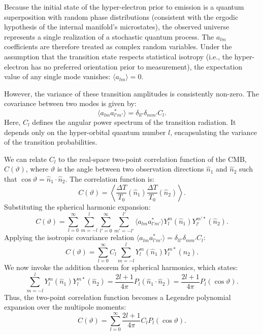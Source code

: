 Because the initial state of the hyper-electron prior to emission is a quantum superposition with random phase distributions (consistent with the ergodic hypothesis of the internal manifold's microstates), the observed universe represents a single realization of a stochastic quantum process. The $a_{lm}$ coefficients are therefore treated as complex random variables. Under the assumption that the transition state respects statistical isotropy (i.e., the hyper-electron has no preferred orientation prior to measurement), the expectation value of any single mode vanishes: $\langle a_{lm} \rangle = 0$.

However, the variance of these transition amplitudes is consistently non-zero. The covariance between two modes is given by:
\begin{equation}
\langle a_{lm} a_{l'm'}^* \rangle = \delta_{ll'} \delta_{mm'} C_l.
\end{equation}
Here, $C_l$ defines the angular power spectrum of the transition radiation. It depends only on the hyper-orbital quantum number $l$, encapsulating the variance of the transition probabilities.

We can relate $C_l$ to the real-space two-point correlation function of the CMB, $C(\vartheta)$, where $\vartheta$ is the angle between two observation directions $\hat{n}_1$ and $\hat{n}_2$ such that $\cos\vartheta = \hat{n}_1 \cdot \hat{n}_2$. The correlation function is:
\begin{equation}
C(\vartheta) = \left\langle \frac{\Delta T}{T_0}(\hat{n}_1) \frac{\Delta T}{T_0}(\hat{n}_2) \right\rangle.
\end{equation}
Substituting the spherical harmonic expansion:
\begin{equation}
C(\vartheta) = \sum_{l=0}^{\infty} \sum_{m=-l}^{l} \sum_{l'=0}^{\infty} \sum_{m'=-l'}^{l'} \langle a_{lm} a_{l'm'}^* \rangle Y_l^m(\hat{n}_1) Y_{l'}^{m'*}(\hat{n}_2).
\end{equation}
Applying the isotropic covariance relation $\langle a_{lm} a_{l'm'}^* \rangle = \delta_{ll'} \delta_{mm'} C_l$:
\begin{equation}
C(\vartheta) = \sum_{l=0}^{\infty} C_l \sum_{m=-l}^{l} Y_l^m(\hat{n}_1) Y_l^{m*}(\hat{n}_2).
\end{equation}
We now invoke the addition theorem for spherical harmonics, which states:
\begin{equation}
\sum_{m=-l}^{l} Y_l^m(\hat{n}_1) Y_l^{m*}(\hat{n}_2) = \frac{2l+1}{4\pi} P_l(\hat{n}_1 \cdot \hat{n}_2) = \frac{2l+1}{4\pi} P_l(\cos\vartheta).
\end{equation}
Thus, the two-point correlation function becomes a Legendre polynomial expansion over the multipole moments:
\begin{equation}
C(\vartheta) = \sum_{l=0}^{\infty} \frac{2l+1}{4\pi} C_l P_l(\cos\vartheta).
\end{equation}

